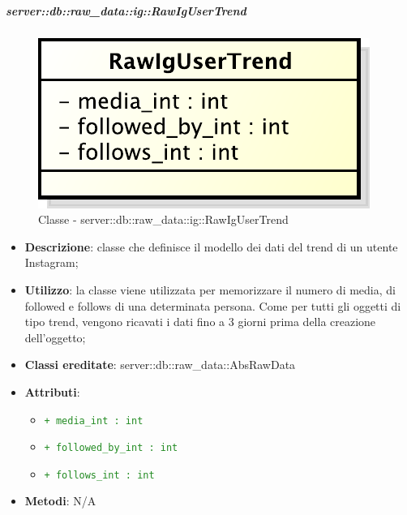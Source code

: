		\subparagraph{server::db::raw\_data::ig::RawIgUserTrend} %
		\label{subp:server_db_raw_data_ig_rawigusertrend}
			\begin{figure}[htbp]
				\centering
				\centerline{\includegraphics[scale=0.75]{./images/server/classes/db/raw_ig_user_trend.pdf}}
				\caption{Classe - server::db::raw\_data::ig::RawIgUserTrend}
			\end{figure}
			\begin{itemize}
				\item \textbf{Descrizione}: classe che definisce il modello dei dati del trend di un utente Instagram;
				\item \textbf{Utilizzo}: la classe viene utilizzata per memorizzare il numero di media, di followed e follows di una determinata persona. Come per tutti gli oggetti di tipo trend, vengono ricavati i dati fino a 3 giorni prima della creazione dell'oggetto;
				\item \textbf{Classi ereditate}: server::db::raw\_data::AbsRawData
				\item \textbf{Attributi}:
					\begin{itemize}
						\item \textcolor{forestgreen}{\texttt{+ media\_int : int}}
						\item \textcolor{forestgreen}{\texttt{+ followed\_by\_int : int}}
						\item \textcolor{forestgreen}{\texttt{+ follows\_int : int}}
					\end{itemize}
				\item \textbf{Metodi}: N/A
			\end{itemize}


